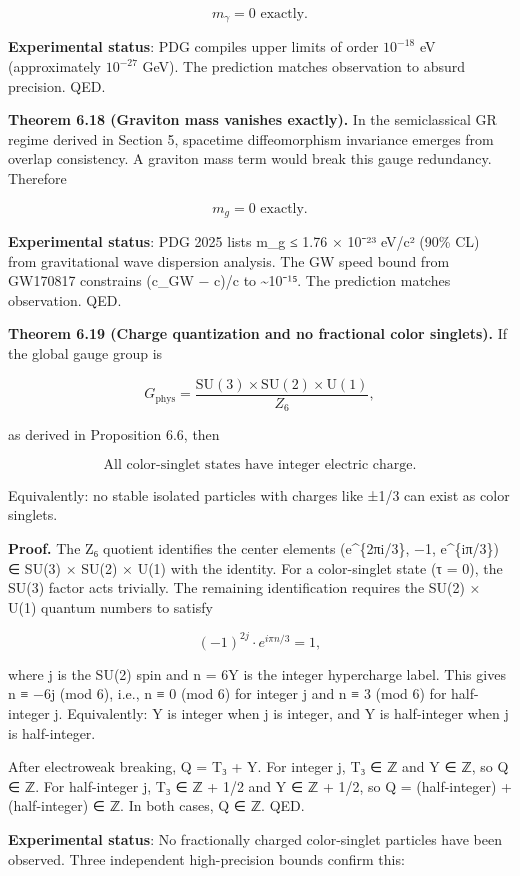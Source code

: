 \[
m_\gamma = 0 \text{ exactly.}
\]

\textbf{Experimental status}: PDG compiles upper limits of order \(10^{-18}\) eV (approximately \(10^{-27}\) GeV). The prediction matches observation to absurd precision. QED.

\textbf{Theorem 6.18 (Graviton mass vanishes exactly).} In the semiclassical GR regime derived in Section 5, spacetime diffeomorphism invariance emerges from overlap consistency. A graviton mass term would break this gauge redundancy. Therefore

\[
m_g = 0 \text{ exactly.}
\]

\textbf{Experimental status}: PDG 2025 lists m\_g ≤ 1.76 × 10⁻²³ eV/c² (90\% CL) from gravitational wave dispersion analysis. The GW speed bound from GW170817 constrains (c\_GW − c)/c to \textasciitilde10⁻¹⁵. The prediction matches observation. QED.

\textbf{Theorem 6.19 (Charge quantization and no fractional color singlets).} If the global gauge group is

\[
G_{\mathrm{phys}} = \frac{\mathrm{SU}(3) \times \mathrm{SU}(2) \times \mathrm{U}(1)}{Z_6},
\]

as derived in Proposition 6.6, then

\[
\text{All color-singlet states have integer electric charge.}
\]

Equivalently: no stable isolated particles with charges like ±1/3 can exist as color singlets.

\textbf{Proof.} The Z₆ quotient identifies the center elements (e\^{}\{2πi/3\}, −1, e\^{}\{iπ/3\}) ∈ SU(3) × SU(2) × U(1) with the identity. For a color-singlet state (τ = 0), the SU(3) factor acts trivially. The remaining identification requires the SU(2) × U(1) quantum numbers to satisfy

\[
(-1)^{2j} \cdot e^{i\pi n/3} = 1,
\]

where j is the SU(2) spin and n = 6Y is the integer hypercharge label. This gives n ≡ −6j (mod 6), i.e., n ≡ 0 (mod 6) for integer j and n ≡ 3 (mod 6) for half-integer j. Equivalently: Y is integer when j is integer, and Y is half-integer when j is half-integer.

After electroweak breaking, Q = T₃ + Y. For integer j, T₃ ∈ ℤ and Y ∈ ℤ, so Q ∈ ℤ. For half-integer j, T₃ ∈ ℤ + 1/2 and Y ∈ ℤ + 1/2, so Q = (half-integer) + (half-integer) ∈ ℤ. In both cases, Q ∈ ℤ. QED.

\textbf{Experimental status}: No fractionally charged color-singlet particles have been observed. Three independent high-precision bounds confirm this:

